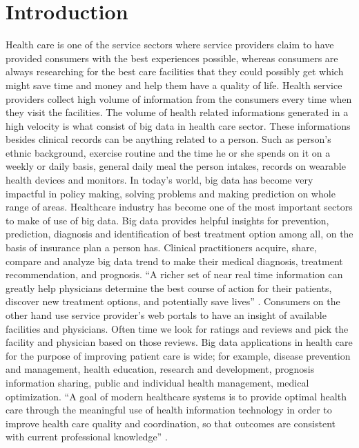 \documentclass[sigconf]{acmart}
\begin{document}
\section{Introduction}
Health care is one of the service sectors where service providers claim to have provided consumers with the best experiences 
possible, whereas consumers are always researching for the best care facilities that they could possibly get which might save 
time and money and help them have a quality of life. Health service providers collect high volume of information from the 
consumers every time when they visit the facilities. The volume of health related informations generated in a high velocity 
is what consist of big data in health care sector.
These informations besides clinical records can be anything related to a person. Such as  person's ethnic background, exercise routine
and the time he or she spends on it on a weekly or daily basis, general daily meal the person intakes, records on wearable health devices 
and monitors. In today's world, big data has become very impactful in policy making, solving problems and making prediction on 
whole range 
of areas. Healthcare industry has become one of the most important sectors to make of use of big data. Big data provides 
helpful insights 
for prevention, prediction, diagnosis and identification of best treatment option among all, on the basis of insurance plan a person 
has. Clinical practitioners acquire, share, compare and analyze big data trend to make their medical diagnosis, treatment
recommendation, and prognosis. ``A richer set of near real time information can greatly help
physicians determine the best course of action for their patients, discover new treatment
options, and potentially save lives'' \cite{www-hpe}. Consumers on the other hand use 
service provider's web portals
to have an insight of available facilities and physicians.
Often time we look for ratings and reviews and pick the facility and physician based on those reviews. Big data applications in 
health care for the purpose of
improving patient care is wide; for example,  disease prevention and management, health education, research and development, prognosis  
information sharing, public and individual health management, medical optimization. ``A goal of modern healthcare systems is to
provide optimal health care through the meaningful use of health information technology in order to improve health care quality 
and coordination, so that outcomes are consistent with current professional 
knowledge'' \cite{www-mapr-com}.
\end{document}
